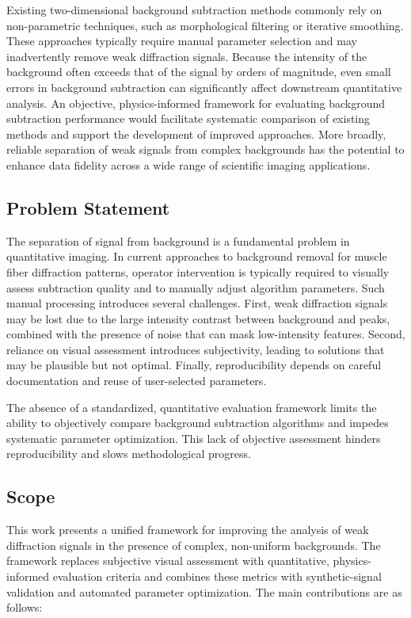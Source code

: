\documentclass[iucr]{iucrjournals}
\begin{document}
Existing two-dimensional background subtraction methods commonly rely on non-parametric techniques, such as morphological filtering or iterative smoothing. These approaches typically require manual parameter selection and may inadvertently remove weak diffraction signals. Because the intensity of the background often exceeds that of the signal by orders of magnitude, even small errors in background subtraction can significantly affect downstream quantitative analysis. An objective, physics-informed framework for evaluating background subtraction performance would facilitate systematic comparison of existing methods and support the development of improved approaches. More broadly, reliable separation of weak signals from complex backgrounds has the potential to enhance data fidelity across a wide range of scientific imaging applications.

\subsection{Problem Statement}

The separation of signal from background is a fundamental problem in quantitative imaging. In current approaches to background removal for muscle fiber diffraction patterns, operator intervention is typically required to visually assess subtraction quality and to manually adjust algorithm parameters. Such manual processing introduces several challenges. First, weak diffraction signals may be lost due to the large intensity contrast between background and peaks, combined with the presence of noise that can mask low-intensity features. Second, reliance on visual assessment introduces subjectivity, leading to solutions that may be plausible but not optimal. Finally, reproducibility depends on careful documentation and reuse of user-selected parameters.

The absence of a standardized, quantitative evaluation framework limits the ability to objectively compare background subtraction algorithms and impedes systematic parameter optimization. This lack of objective assessment hinders reproducibility and slows methodological progress.


\subsection{Scope}

This work presents a unified framework for improving the analysis of weak diffraction signals in the presence of complex, non-uniform backgrounds. The framework replaces subjective visual assessment with quantitative, physics-informed evaluation criteria and combines these metrics with synthetic-signal validation and automated parameter optimization. The main contributions are as follows:
\end{document}
